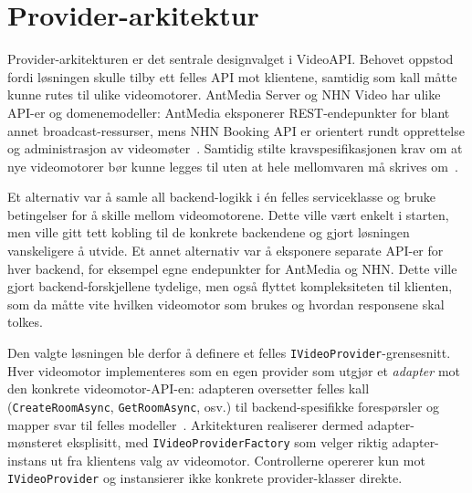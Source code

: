 \section{Provider-arkitektur}
\label{sec:provider-pattern}

Provider-arkitekturen er det sentrale designvalget i VideoAPI. Behovet oppstod
fordi løsningen skulle tilby ett felles API mot klientene, samtidig som kall
måtte kunne rutes til ulike videomotorer. AntMedia Server og NHN Video har ulike
API-er og domenemodeller: AntMedia eksponerer REST-endepunkter for blant annet
broadcast-ressurser, mens NHN Booking API er orientert rundt opprettelse og
administrasjon av videomøter~\cite{antmedia_rest,nhn_booking}. Samtidig stilte
kravspesifikasjonen krav om at nye videomotorer bør kunne legges til uten at hele
mellomvaren må skrives om~\cite{hdo_kravspec}.

Et alternativ var å samle all backend-logikk i én felles serviceklasse og bruke
betingelser for å skille mellom videomotorene. Dette ville vært enkelt i starten,
men ville gitt tett kobling til de konkrete backendene og gjort løsningen
vanskeligere å utvide. Et annet alternativ var å eksponere separate API-er for
hver backend, for eksempel egne endepunkter for AntMedia og NHN. Dette ville
gjort backend-forskjellene tydelige, men også flyttet kompleksiteten til
klienten, som da måtte vite hvilken videomotor som brukes og hvordan responsene
skal tolkes.


Den valgte løsningen ble derfor å definere et felles
\texttt{IVideoProvider}-grensesnitt. Hver videomotor implementeres som en egen
provider som utgjør et \emph{adapter} mot den konkrete videomotor-API-en:
adapteren oversetter felles kall (\texttt{CreateRoomAsync}, \texttt{GetRoomAsync},
osv.) til backend-spesifikke forespørsler og mapper svar til felles modeller~\cite{gamma1994}. Arkitekturen
realiserer dermed adapter-mønsteret eksplisitt, med \texttt{IVideoProviderFactory}
som velger riktig adapter-instans ut fra klientens valg av videomotor.
Controllerne opererer kun mot \texttt{IVideoProvider} og instansierer ikke
konkrete provider-klasser direkte.

